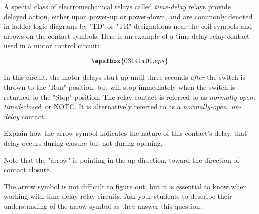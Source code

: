 

A special class of electromechanical relays called {\it time-delay} relays provide delayed action, either upon power-up or power-down, and are commonly denoted in ladder logic diagrams by "TD" or "TR" designations near the coil symbols and arrows on the contact symbols.  Here is an example of a time-delay relay contact used in a motor control circuit:

$$\epsfbox{03141x01.eps}$$

In this circuit, the motor delays start-up until three seconds {\it after} the switch is thrown to the "Run" position, but will stop immediately when the switch is returned to the "Stop" position.  The relay contact is referred to as {\it normally-open, timed-closed}, or NOTC.  It is alternatively referred to as a {\it normally-open, on-delay} contact.

Explain how the arrow symbol indicates the nature of this contact's delay, that delay occurs during closure but not during opening.







Note that the "arrow" is pointing in the up direction, toward the direction of contact closure.







The arrow symbol is not difficult to figure out, but it is essential to know when working with time-delay relay circuits.  Ask your students to describe their understanding of the arrow symbol as they answer this question.




